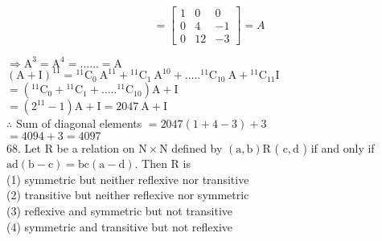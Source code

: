 \documentclass[10pt]{article}
\begin{document}
\[
=\left[\begin{array}{ccc}
1 & 0 & 0 \\
0 & 4 & -1 \\
0 & 12 & -3
\end{array}\right]=A
\]

\(\Rightarrow \mathrm{A}^{3}=\mathrm{A}^{4}=\ldots \ldots=\mathrm{A}\)\\
\((\mathrm{A}+\mathrm{I})^{11}={ }^{11} \mathrm{C}_{0} \mathrm{~A}^{11}+{ }^{11} \mathrm{C}_{1} \mathrm{~A}^{10}+\ldots . .{ }^{11} \mathrm{C}_{10} \mathrm{~A}+{ }^{11} \mathrm{C}_{11} \mathrm{I}\)\\
\(=\left({ }^{11} \mathrm{C}_{0}+{ }^{11} \mathrm{C}_{1}+\ldots . .{ }^{11} \mathrm{C}_{10}\right) \mathrm{A}+\mathrm{I}\)\\
\(=\left(2^{11}-1\right) \mathrm{A}+\mathrm{I}=2047 \mathrm{~A}+\mathrm{I}\)\\
\(\therefore\) Sum of diagonal elements \(=2047(1+4-3)+3\)\\
\(=4094+3=4097\)\\
68. Let R be a relation on \(\mathrm{N} \times \mathrm{N}\) defined by \((\mathrm{a}, \mathrm{b}) \mathrm{R}\) ( \(\mathrm{c}, \mathrm{d}\) ) if and only if \(\mathrm{ad}(\mathrm{b}-\mathrm{c})=\mathrm{bc}(\mathrm{a}-\mathrm{d})\). Then R is\\
(1) symmetric but neither reflexive nor transitive\\
(2) transitive but neither reflexive nor symmetric\\
(3) reflexive and symmetric but not transitive\\
(4) symmetric and transitive but not reflexive
\end{document}
